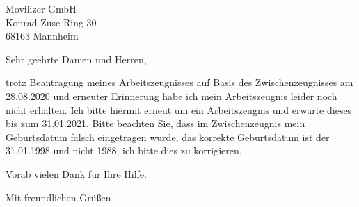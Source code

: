 \documentclass[
fontsize=12pt,
%
parskip=full,
%
paper=A4,	
%
fromalign=right,
%
fromphone=true,
%
%
fromemail=true,
%
%
%
version=last,
]{scrlttr2}
\begin{document}
	\begin{letter}{
			Movilizer GmbH\\
			Konrad-Zuse-Ring 30\\
			68163 Mannheim
		}
		
		\opening{Sehr geehrte Damen und Herren,}
		
		trotz Beantragung meines Arbeitszeugnisses auf Basis des Zwischenzeugnisses am 28.08.2020 und erneuter Erinnerung habe ich mein Arbeitszeugnis leider noch nicht erhalten. Ich bitte hiermit erneut um ein Arbeitszeugnis und erwarte dieses bis zum 31.01.2021. Bitte beachten Sie, dass im Zwischenzeugnis mein Geburtsdatum falsch eingetragen wurde, das korrekte Geburtsdatum ist der 31.01.1998 und nicht 1988, ich bitte dies zu korrigieren.
		
		Vorab vielen Dank für Ihre Hilfe.
		
		\closing{Mit freundlichen Grüßen}
		
		
		
		
	\end{letter}
	
	
\end{document}
